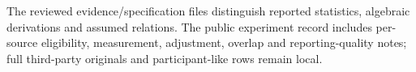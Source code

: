 \documentclass[10pt,twocolumn]{article}
\begin{document}
The reviewed evidence/specification files distinguish reported statistics, algebraic derivations and assumed relations. The public experiment record includes per-source eligibility, measurement, adjustment, overlap and reporting-quality notes; full third-party originals and participant-like rows remain local.
\end{document}
